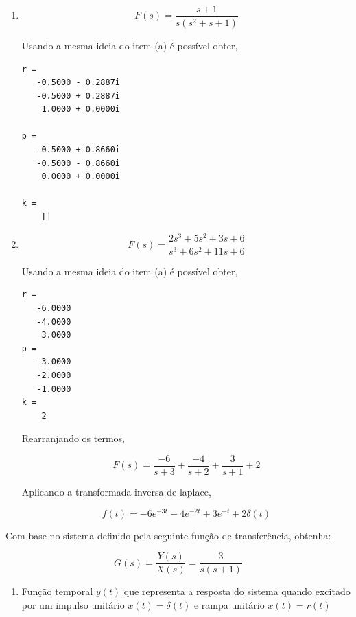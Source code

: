 \documentclass[a4paper, 10pt]{article}
\begin{document}
\begin{list}{\textbf{Questão .}}{
\setlength{\labelwidth}{-2mm} \setlength{\parsep}{0mm}
\setlength{\topsep}{0mm} \setlength{\leftmargin}{0mm}}
\begin{enumerate}
    \item

        $$
        F(s) = \frac{s+1}{s(s^2+s+1)}
        $$

        Usando a mesma ideia do item (a) é possível obter, 

        \begin{lstlisting}
r = 
   -0.5000 - 0.2887i
   -0.5000 + 0.2887i
    1.0000 + 0.0000i

p = 
   -0.5000 + 0.8660i
   -0.5000 - 0.8660i
    0.0000 + 0.0000i

k = 
    []
    \end{lstlisting}


    \item

        $$
        F(s) = \frac{2 s^3 + 5 s^2 + 3 s + 6}{s^3 + 6 s^2 + 11 s + 6}
        $$

        Usando a mesma ideia do item (a) é possível obter, 

        \begin{lstlisting}
r = 
   -6.0000
   -4.0000
    3.0000
p = 
   -3.0000
   -2.0000
   -1.0000
k = 
    2
    \end{lstlisting}


        Rearranjando os termos, 

        $$
        F(s) = \frac{-6}{s+3} + \frac{-4}{s+2} + \frac{3}{s+1} + 2
        $$

        Aplicando a transformada inversa de laplace,

        $$
        f(t) = -6 e^{-3t} -4 e^{-2t} + 3 e^{-t} + 2 \delta(t)
        $$

    \end{enumerate}






\newpage


\item 
    Com base no sistema definido pela seguinte função de transferência, obtenha:

    $$
    G(s) = \frac{Y(s)}{X(s)} = \frac{3}{s(s+1)}
    $$
    \begin{enumerate}
        \item
            Função temporal $y(t)$ que representa a resposta do sistema quando excitado
            por um impulso unitário $x(t)=\delta(t)$ e rampa unitário $x(t)=r(t)$ \\


\end{enumerate}
\end{list}
\end{document}

